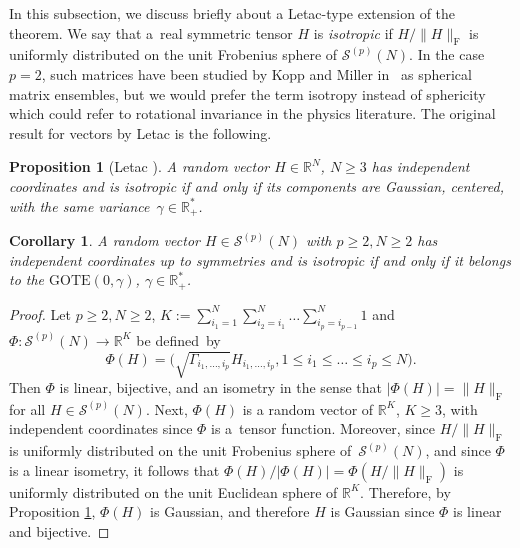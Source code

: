 \documentclass[pdftex]{sigma}
\numberwithin{equation}{section}
\newtheorem{Corollary}[Theorem]{Corollary}
\newtheorem{Proposition}[Theorem]{Proposition}
\theoremstyle{definition}
\begin{document}
In this subsection, we discuss briefly about a Letac-type extension of the theorem. We say that a~real symmetric tensor $H$ is {\em isotropic} if $H / \| H \|_{\mathrm{F}}$ is uniformly distributed on the unit Frobenius sphere of $\mathcal{S}^{(p)}(N)$. In the case $p=2$, such matrices have been studied by Kopp and Miller in~\cite{koppmiller} as spherical matrix ensembles, but we would prefer the term isotropy instead of sphericity which could refer to rotational invariance in the physics literature. The original result for vectors by Letac is the following.
\begin{Proposition}[Letac \cite{letac}]\label{prop:let}
    A random vector $H \in \mathbb{R}^N$, $N \geq 3$ has independent coordinates and is isotropic if and only if its components are Gaussian, centered, with the same variance~${\gamma \in \mathbb{R}^*_+}$.
\end{Proposition}
\begin{Corollary}\label{cor:let}
    A random vector $H \in \mathcal{S}^{(p)}(N)$ with $p\geq 2, N \geq 2$ has independent coordinates up to symmetries and is isotropic if and only if it belongs to the $\mathrm{GOTE}(0,\gamma)$, $\gamma \in \mathbb{R}^*_+$.
\end{Corollary}
\begin{proof}
Let $p\geq 2,N\geq 2$, $K:=\sum_{i_1=1}^N \sum_{i_2=i_1}^N \dots \sum_{i_p=i_{p-1}}^N 1$ and $\Phi\colon\mathcal{S}^{(p)}(N)\to\mathbb{R}^{K}$ be defined~by
\[
\Phi(H)=\Bigr(\sqrt{\Gamma_{i_1,\dots,i_p}} H_{i_1,\dots,i_p}, 1\leq i_1 \leq \dots \leq i_p \leq N\Bigr).
\]
Then $\Phi$ is linear, bijective, and an isometry in the sense that $|\Phi(H)|=\|H\|_{\mathrm{F}}$ for all ${H\in\mathcal{S}^{(p)}(N)}$. Next, $\Phi(H)$ is a random vector of $\mathbb{R}^K$, $K\geq3$, with independent coordinates since $\Phi$ is a~tensor function. Moreover, since $H/\|H\|_{\mathrm{F}}$ is uniformly distributed on the unit Frobenius sphere of~$\mathcal{S}^{(p)}(N)$, and since $\Phi$ is a linear isometry, it follows that $\Phi(H)/|\Phi(H)|=\Phi(H/\|H\|_{\mathrm{F}})$ is uniformly distributed on the unit Euclidean sphere of $\mathbb{R}^K$. Therefore, by Proposition \ref{prop:let}, $\Phi(H)$ is Gaussian, and therefore $H$ is Gaussian since $\Phi$ is linear and bijective.
\end{proof}
\end{document}
